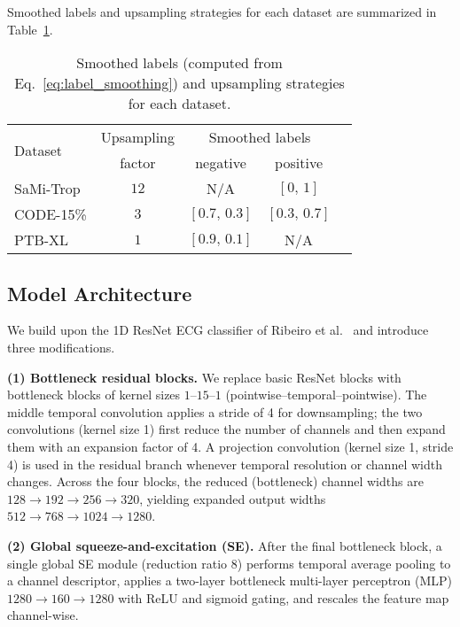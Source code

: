 \documentclass[twocolumn]{cinc}
\begin{document}
Smoothed labels and upsampling strategies for each dataset are summarized in Table~\ref{tab:augmentation}.


\begin{table}[!h]
\centering
\begin{tabular}{lcccc}
\toprule
\multirow{2}{*}{Dataset} & Upsampling & \multicolumn{2}{c}{Smoothed labels} \\ \cmidrule(lr){3-4}
& factor & negative & positive \\
\midrule
SaMi-Trop & $12$ & N/A          & $[0,\,1]$     \\
CODE-15\% & $3$ & $[0.7,\,0.3]$ & $[0.3,\,0.7]$ \\
PTB-XL    & $1$ & $[0.9,\,0.1]$ & N/A           \\
\bottomrule
\end{tabular}

\caption{Smoothed labels (computed from Eq.~\ref{eq:label_smoothing}) and upsampling strategies for each dataset.}
\label{tab:augmentation}
\end{table}


\subsection{Model Architecture}
\label{subsec:model}


We build upon the 1D ResNet ECG classifier of Ribeiro et al.~\cite{ribeiro2020automatic} and introduce three modifications.

\textbf{(1) Bottleneck residual blocks.} We replace basic ResNet blocks with bottleneck blocks of kernel sizes $1$–$15$–$1$ (pointwise--temporal--pointwise). The middle temporal convolution applies a stride of 4 for downsampling; the two convolutions (kernel size 1) first reduce the number of channels and then expand them with an expansion factor of 4. A projection convolution (kernel size 1, stride 4) is used in the residual branch whenever temporal resolution or channel width changes. Across the four blocks, the reduced (bottleneck) channel widths are $128 \to 192 \to 256 \to 320$, yielding expanded output widths $512 \to 768 \to 1024 \to 1280$.

\textbf{(2) Global squeeze-and-excitation (SE).} After the final bottleneck block, a single global SE module (reduction ratio 8) \cite{hu2018senet} performs temporal average pooling to a channel descriptor, applies a two-layer bottleneck multi-layer perceptron (MLP) $1280 \to 160 \to 1280$ with ReLU and sigmoid gating, and rescales the feature map channel-wise.
\end{document}
